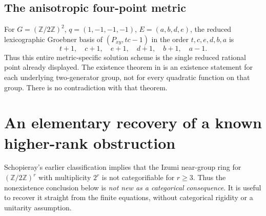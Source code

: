 \documentclass[11pt]{article}
\theoremstyle{remark}
\newcommand{\Z}{\mathbb Z}
\begin{document}
\subsection{The anisotropic four-point metric}
For $G=(\Z/2\Z)^2$, $q=(1,-1,-1,-1)$, $E=(a,b,d,e)$, the reduced
lexicographic Groebner basis of $(P_{xy},tc-1)$ in the order $t,c,e,d,b,a$ is
\[
 t+1,\quad c+1,\quad e+1,\quad d+1,\quad b+1,\quad a-1.
\]
Thus this entire metric-specific solution scheme is the single reduced
rational point already displayed. The existence theorem in \cite{RW} is an
existence statement for each underlying two-generator group, not for every
quadratic function on that group. There is no contradiction with that theorem.

\section{An elementary recovery of a known higher-rank obstruction}\label{sec:two}
Schopieray's earlier classification \cite[Theorem 1.1]{Sch} implies that the
Izumi near-group ring for $(\Z/2\Z)^r$ with multiplicity $2^r$ is not
categorifiable for $r\ge3$. Thus the nonexistence conclusion below is
\emph{not new as a categorical consequence}. It is useful to recover it
straight from the finite equations, without categorical rigidity or a
unitarity assumption.
\end{document}
